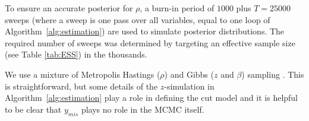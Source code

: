 \documentclass{article}
\begin{document}
To ensure an accurate posterior for $\rho$, a burn-in period of $1000$ plus $T=25000$
 sweeps (where a sweep is one pass over all variables, equal to
 one loop of Algorithm~\ref{alg:estimation}) are used to simulate posterior distributions. The required number of sweeps
 was determined by targeting an effective sample size (see Table \ref{tab:ESS}) in the thousands. %

We use a mixture of Metropolis Hastings ($\rho$) and Gibbs ($z$ and $\beta$) sampling \cites{dittrich2017bayesian, lesage1997bayesian}.
This is straightforward, but some details of the $z$-simulation in Algorithm~\ref{alg:estimation} play a role in defining the cut model
and it is helpful to be clear that $y_{mis}$ plays no role in the MCMC itself.
\end{document}
